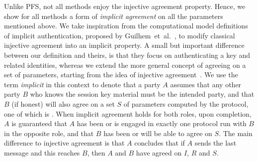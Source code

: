 
Unlike PFS, not all \mEdhoc{} methods enjoy the injective agreement property.
%
Hence, we show for all methods a form of \emph{implicit agreement} on all the
parameters mentioned above.
%
We take inspiration from the computational model definitions of implicit
authentication, proposed by Guilhem~et~al.~\cite{DBLP:conf/csfw/GuilhemFW20}, to
modify classical injective agreement into an implicit property.
%
A small but important difference between our definition and theirs, is that
they focus on
authenticating a key and related identities, whereas we extend the more general
concept of agreeing on a set of parameters, starting from the idea of injective
agreement~\cite{DBLP:conf/csfw/Lowe97a}.
%
We use the term \emph{implicit} in this context to denote that a party $A$
assumes that any other party $B$ who knows the session key material \mSessKey{} must
be the intended party, and that $B$ (if honest) will also agree on a set
$S$ of parameters computed by the protocol, one of which is \mSessKey{}.
%
When implicit agreement holds for both roles, upon completion, $A$ is guaranteed
that $A$ has been or is engaged in exactly one protocol run with $B$ in the
opposite role, and that $B$ has been or will be able to agree on $S$.
%
The main difference to injective agreement is that $A$ concludes that if
$A$ sends the last message and this reaches $B$, then $A$ and $B$ have agreed
on $I$, $R$ and $S$.
%
%

